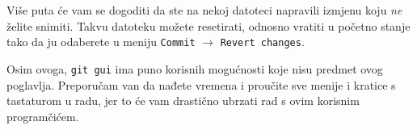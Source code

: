 Više puta će vam se dogoditi da ste na nekoj datoteci napravili izmjenu koju \emph{ne} želite snimiti. 
Takvu datoteku možete resetirati, odnosno vratiti u početno stanje tako da ju odaberete u meniju \verb+Commit+ $\rightarrow$ \verb+Revert changes+.

Osim ovoga, \verb+git gui+ ima puno korisnih mogućnosti koje nisu predmet ovog poglavlja.
Preporučam van da nađete vremena i proučite sve menije i kratice s tastaturom u radu, jer to će vam drastično ubrzati rad s ovim korisnim programčićem.



